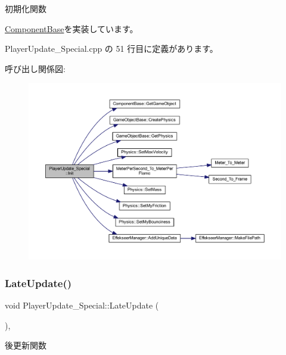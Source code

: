 初期化関数 



\mbox{\hyperlink{class_component_base_a125939d6befe42f28886a6523e86b18b}{Component\+Base}}を実装しています。



 Player\+Update\+\_\+\+Special.\+cpp の 51 行目に定義があります。

呼び出し関係図\+:\nopagebreak
\begin{figure}[H]
\begin{center}
\leavevmode
\includegraphics[width=350pt]{class_player_update___special_a48906da6915325d92d5cc6ec67212259_cgraph}
\end{center}
\end{figure}
\mbox{\label{class_player_update___special_a1daae8fdcd87bf907313a98e022f254c}} 
\subsubsection{\texorpdfstring{Late\+Update()}{LateUpdate()}}
{\footnotesize\ttfamily void Player\+Update\+\_\+\+Special\+::\+Late\+Update (\begin{DoxyParamCaption}{ }\end{DoxyParamCaption})\hspace{0.3cm}{\ttfamily [override]}, {\ttfamily [virtual]}}



後更新関数 



